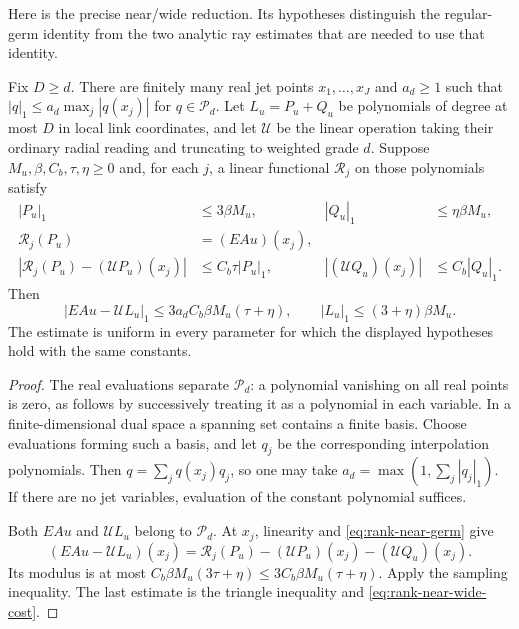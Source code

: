 Here is the precise near/wide reduction. Its hypotheses distinguish the
regular-germ identity from the two analytic ray estimates that are
needed to use that identity.
\begin{lemma}\label{lem:rank-near-wide-prepin}
Fix $D\ge d$. There are finitely many real jet points
$x_1,\ldots,x_J$ and $a_d\ge1$ such that
$|q|_1\le a_d\max_j|q(x_j)|$ for $q\in\mathscr P_d$.
Let $L_u=P_u+Q_u$ be polynomials of degree at most $D$ in local link
coordinates, and let $\mathscr U$ be the linear operation taking their
ordinary radial reading and truncating to weighted grade $d$.
Suppose $M_u,\beta,C_b,\tau,\eta\ge0$ and, for each $j$, a linear
functional $\mathscr R_j$ on those polynomials satisfy
\begin{align}
 |P_u|_1&\le3\beta M_u,& |Q_u|_1&\le\eta\beta M_u,
       \label{eq:rank-near-wide-cost}\\
 \mathscr R_j(P_u)&=(EAu)(x_j),
       \label{eq:rank-near-germ}\\
 |\mathscr R_j(P_u)-(\mathscr U P_u)(x_j)|
       &\le C_b\tau|P_u|_1,&
 |(\mathscr U Q_u)(x_j)|&\le C_b|Q_u|_1.
       \label{eq:rank-ray-comparison}
\end{align}
Then
\begin{equation}\label{eq:rank-polynomial-prepin}
 |EAu-\mathscr U L_u|_1
 \le3a_d C_b\beta M_u(\tau+\eta),\qquad
 |L_u|_1\le(3+\eta)\beta M_u.
\end{equation}
The estimate is uniform in every parameter for which the displayed
hypotheses hold with the same constants.
\end{lemma}
\begin{proof}
The real evaluations separate $\mathscr P_d$: a polynomial vanishing
on all real points is zero, as follows by successively treating it as
a polynomial in each variable. In a finite-dimensional dual space a
spanning set contains a finite basis. Choose evaluations forming such
a basis, and let $q_j$ be the corresponding interpolation polynomials.
Then $q=\sum_jq(x_j)q_j$, so one may take
$a_d=\max(1,\sum_j|q_j|_1)$. If there are no jet variables, evaluation
of the constant polynomial suffices.

Both $EAu$ and $\mathscr U L_u$ belong to $\mathscr P_d$. At $x_j$,
linearity and \eqref{eq:rank-near-germ} give
\[
 (EAu-\mathscr U L_u)(x_j)
 =\mathscr R_j(P_u)-(\mathscr U P_u)(x_j)
                         -(\mathscr U Q_u)(x_j).
\]
Its modulus is at most
$C_b\beta M_u(3\tau+\eta)\le3C_b\beta M_u(\tau+\eta)$.
Apply the sampling inequality. The last estimate is the triangle
inequality and \eqref{eq:rank-near-wide-cost}.
\end{proof}

